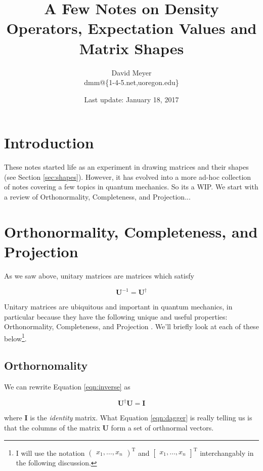 \documentclass[11pt, oneside]{article}   	%
\title{A Few Notes on Density Operators, Expectation Values and Matrix Shapes}
\author{David Meyer \\ dmm@\{1-4-5.net,uoregon.edu\}}
\date{Last update: January 18, 2017}							%
\begin{document}
\maketitle

\section{Introduction}
These notes started life as an experiment in drawing matrices and their shapes (see Section \ref{sec:shapes}). However, it has evolved into a more ad-hoc collection of notes
covering a few topics in quantum mechanics. So its a WIP. We start with a review of Orthonormality, Completeness, and Projection...


\section{Orthonormality, Completeness, and Projection}
As we saw above, unitary matrices are matrices which satisfy 

\begin{equation}
\mathbf{U}^{-1} = \mathbf{U}^{\dagger}
\label{eqn:inverse}
\end{equation}

\bigskip
\noindent
Unitary matrices are ubiquitous and important in quantum mechanics, in 
particular because they have the following unique and useful properties: Orthonormality, Completeness, and Projection \cite{cresser2007}. 
We'll briefly look at each of these below\footnote{I will use the 
notation $\begin{pmatrix} x_1, \hdots, x_n \end{pmatrix}^{\text{T}}$ and $\begin{bmatrix} x_1, \hdots, x_n \end{bmatrix}^\text{T}$ interchangably in the following discussion.}.


\subsection{Orthornomality}
We can rewrite Equation \ref{eqn:inverse} as

\begin{equation}
\mathbf{U}^{\dagger} \mathbf{U} = \mathbf{I}
\label{eqn:dagger}
\end{equation}

\bigskip
\noindent
where \textbf{I} is the \emph{identity} matrix. What Equation \ref{eqn:dagger} is really telling us is that the columns of the matrix \textbf{U} form a set of orthnormal vectors.
\end{document}
